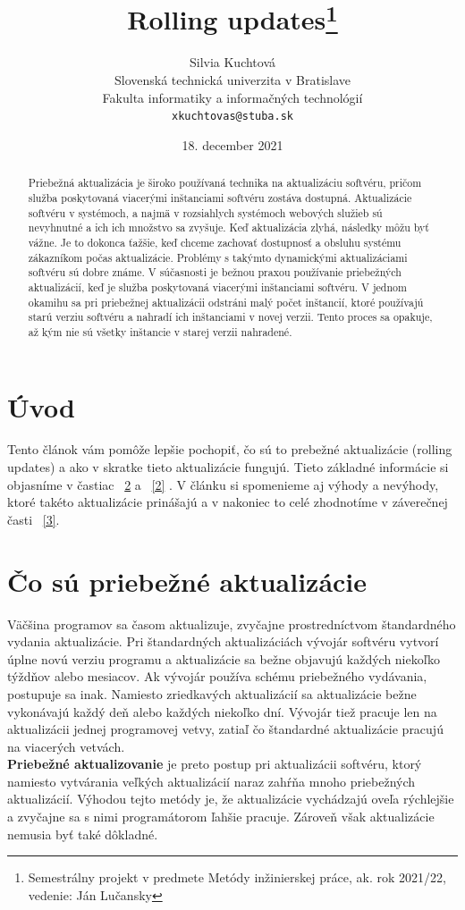 \documentclass[10pt,twoside,slovak,a4paper]{article}
\title{Rolling updates\thanks{Semestrálny projekt v predmete Metódy inžinierskej práce, ak. rok 2021/22, vedenie: Ján Lučansky}}
\author{Silvia Kuchtová\\[2pt]
	{\small Slovenská technická univerzita v Bratislave}\\
	{\small Fakulta informatiky a informačných technológií}\\
	{\small \texttt{xkuchtovas@stuba.sk}}
	}
\date{\small 18. december 2021}
\begin{document}
\maketitle

\begin{abstract}
Priebežná aktualizácia je široko používaná technika na aktualizáciu softvéru, pričom služba poskytovaná viacerými inštanciami softvéru zostáva dostupná. Aktualizácie softvéru v  systémoch, a najmä v rozsiahlych systémoch webových služieb sú nevyhnutné a ich ich množstvo sa zvyšuje.  Keď 
aktualizácia zlyhá, následky môžu byť vážne. Je to dokonca ťažšie, keď chceme zachovať dostupnosť a obsluhu systému zákazníkom počas aktualizácie. Problémy s takýmto dynamickými aktualizáciami softvéru sú dobre známe. V súčasnosti je bežnou praxou používanie priebežných aktualizácií, keď je služba poskytovaná viacerými inštanciami softvéru. V jednom okamihu sa pri priebežnej aktualizácii odstráni malý počet inštancií, ktoré používajú starú verziu softvéru a nahradí ich inštanciami v novej verzii. Tento proces sa opakuje, až kým nie sú všetky inštancie v starej verzii nahradené.

\end{abstract}

\section{Úvod}

Tento článok vám pomôže lepšie pochopiť, čo sú to prebežné aktualizácie (rolling updates) a ako v skratke tieto aktualizácie fungujú. Tieto základné informácie si objasníme v častiac ~\ref{1}  a  ~\ref{2}  . V článku si spomenieme aj výhody a nevýhody, ktoré takéto aktualizácie prinášajú a v nakoniec to celé zhodnotíme v záverečnej časti ~\ref{3}.

\section{Čo sú priebežné aktualizácie}\label{1}

Väčšina programov sa časom aktualizuje, zvyčajne prostredníctvom štandardného vydania aktualizácie. Pri štandardných aktualizáciách vývojár softvéru vytvorí úplne novú verziu programu a aktualizácie sa bežne objavujú každých niekoľko týždňov alebo mesiacov. Ak vývojár používa schému priebežného vydávania, postupuje sa inak. Namiesto zriedkavých aktualizácií sa aktualizácie bežne vykonávajú každý deň alebo každých niekoľko dní. Vývojár tiež pracuje len na aktualizácii jednej programovej vetvy, zatiaľ čo štandardné aktualizácie pracujú na viacerých vetvách.\\
\textbf{Priebežné aktualizovanie} je preto postup pri aktualizácii softvéru, ktorý namiesto vytvárania veľkých aktualizácií naraz zahŕňa mnoho priebežných aktualizácií.  Výhodou tejto metódy je, že aktualizácie vychádzajú oveľa rýchlejšie a zvyčajne sa s nimi programátorom ľahšie pracuje. Zároveň však aktualizácie nemusia byť také dôkladné\cite{web2}.
\end{document}
